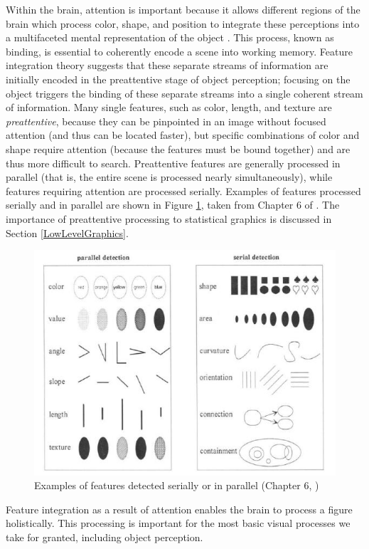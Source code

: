 \documentclass[11pt]{isuthesis}
\begin{document}
Within the brain, attention is important because it allows different regions of the brain which process color, shape, and position to integrate these perceptions into a multifaceted mental representation of the object \citep{goldstein}. This process, known as binding, is essential to coherently encode a scene into working memory. Feature integration theory \citep{treisman1980feature} suggests that these separate streams of information are initially encoded in the preattentive stage of object perception; focusing on the object triggers the binding of these separate streams into a single coherent stream of information. Many single features, such as color, length, and texture are \emph{preattentive}, because they can be pinpointed in an image without focused attention (and thus can be located faster), but specific combinations of color and shape require attention (because the features must be bound together) and are thus more difficult to search. Preattentive features are generally processed in parallel (that is, the entire scene is processed nearly simultaneously), while features requiring attention are processed serially. Examples of features processed  serially and in parallel are shown in Figure \ref{fig:parallelSerialFeatures}, taken from Chapter 6 of \citet{helander1997handbook}. The importance of preattentive processing to statistical graphics is discussed in Section \ref{LowLevelGraphics}. 

\begin{figure}[h]\centering
\includegraphics[width=.7\linewidth]{ParallelSerialFeatures}
\caption{Examples of features detected serially or in parallel (Chapter 6, \protect\citealt{helander1997handbook})}\label{fig:parallelSerialFeatures}
\end{figure}

Feature integration as a result of attention enables the brain to process a figure holistically. This processing is important for the most basic visual processes we take for granted, including object perception. 
\end{document}
